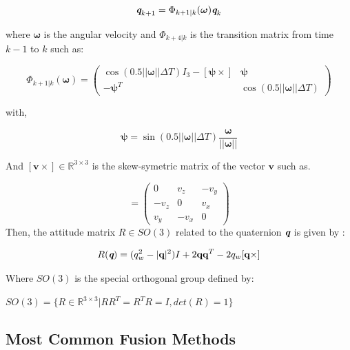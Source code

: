 \documentclass[conference]{IEEEtran}
\begin{document}
\begin{equation}
\mathbi{q}_{k+1} = \Phi_{k+1|k}(\boldsymbol\omega)\mathbi{q}_{k}
\label{quat_kine}
\end{equation}

where $\boldsymbol\omega$ is the angular velocity and $\Phi_{k+4|k}$ is the transition matrix from time $k-1$ to $k$ such as:

\begin{equation}
 \Phi_{k+1|k}(\boldsymbol\omega) = \begin{pmatrix}  \cos(0.5||\boldsymbol\omega||\Delta T)I_3 - [\boldsymbol \psi\times] & \boldsymbol\psi \\ -\boldsymbol\psi^T &  \cos(0.5||\boldsymbol\omega||\Delta T)  \end{pmatrix} 
\end{equation}

 with,
 
\begin{equation}
 \boldsymbol \psi = \sin(0.5||\boldsymbol\omega||\Delta T)\frac{\boldsymbol\omega}{||\boldsymbol\omega||}
\end{equation}

And $[\textbf{v} \times] \in \mathbb{R}^{3\times 3}$ is the skew-symetric matrix of the vector $\textbf{v}$ such as.

\begin{equation}
[\textbf{v} \times] = \begin{pmatrix} 0 & v_z & -v_y \\ -v_z & 0 & v_x \\ v_y & -v_x & 0 \end{pmatrix} 
\label{skewsymmat}
\end{equation}
Then, the attitude matrix $R \in SO(3) $ related to the quaternion $\textbf{\em q}$ is given by :

\begin{equation}
R(\mathbi{q}) = (q_w^2 - |\textbf{q}|^2)I + 2 \textbf{q}\textbf{q}^T - 2q_w[\textbf{q} \times]
\label{quat_to_rot}
\end{equation}

Where $SO(3)$ is the special orthogonal group defined by:

\begin{center}
$SO(3) = \{ R \in \mathbb{R}^{ 3 \times 3} | RR^T = R^TR = I, det(R) = 1 \}$
\end{center}


\subsection{Most Common Fusion Methods}
\end{document}
